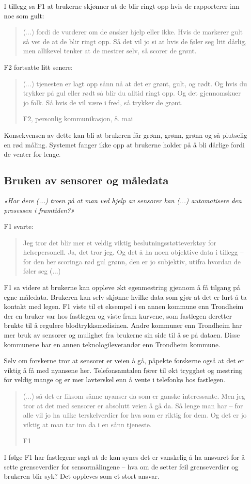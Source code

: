 I tillegg sa F1 at brukerne skjønner at de blir ringt opp hvis de rapporterer inn noe som gult: \blockquote{(...) fordi de vurderer om de ønsker hjelp eller ikke.
    Hvis de markerer gult så vet de at de blir ringt opp. Så det vil jo si at hvis de føler seg litt dårlig, men allikevel tenker at de mestrer selv,
så scorer de grønt.}
F2 fortsatte litt senere: \blockquote[F2, personlig kommunikasjon, 8. mai]{(...) tjenesten er lagt opp sånn nå at det er grønt, gult, og rødt. Og
hvis du trykker på gul eller rødt så blir du alltid ringt opp. Og det gjennomskuer jo folk. Så hvis de vil være i fred, så trykker de grønt.}
Konsekvensen av dette kan bli at brukeren får grønn, grønn, grønn og så plutselig en rød måling. Systemet fanger ikke opp at brukerne holder på å bli
dårlige fordi de venter for lenge.

\subsection{Bruken av sensorer og måledata}
\textit{«Har dere (...) troen på at man ved hjelp av sensorer kan (...) automatisere den prosessen i framtiden?»}

F1 svarte: \blockquote{Jeg tror det blir mer et veldig viktig beslutningsstøtteverktøy for helsepersonell. Ja, det tror jeg. Og det å ha noen objektive data i tillegg --
for den her scoringa rød gul grønn, den er jo subjektiv, utifra hvordan de føler seg (...)}
F1 sa videre at brukerne kan oppleve økt egenmestring gjennom å få tilgang på egne måledata. Brukeren kan selv skjønne hvilke data som gjør at det er lurt å
ta kontakt med legen. F1 viste til et eksempel i en annen kommune enn Trondheim der en bruker var hos fastlegen og viste fram kurvene, som
fastlegen deretter brukte til å regulere blodtrykksmedisinen. Andre kommuner enn Trondheim har mer bruk av sensorer og mulighet fra brukerne sin side
til å se på dataen. Disse kommunene har en annen teknologileverandør enn Trondheim kommune.

Selv om forskerne tror at sensorer er veien å gå, påpekte forskerne også at det er viktig å få med nyansene her.
Telefonsamtalen fører til økt trygghet og mestring for veldig mange og er mer lavterskel enn å vente i telefonkø hos
fastlegen. \blockquote[F1]{(...) så det er liksom sånne nyanser da som er ganske interessante. Men jeg tror at det med sensorer er absolutt veien å gå da. Så lenge man
har -- for alle vil jo ha ulike terskelverdier for hva som er riktig for dem. Og det er jo viktig at man tar inn da i en sånn tjeneste.}
I følge F1 har fastlegene sagt at de kan synes det er vanskelig å ha ansvaret for å sette grenseverdier
for sensormålingene -- hva om de setter feil grenseverdier og brukeren blir syk? Det oppleves som et stort ansvar.

